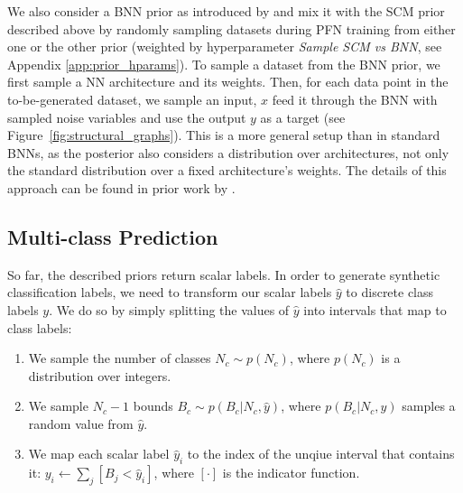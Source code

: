 \documentclass{article}
\begin{document}
We also consider a BNN prior as introduced by \citet{muller-iclr22a} and mix it with the SCM prior described above by randomly sampling datasets during PFN training from either one or the other prior (weighted by hyperparameter \textit{Sample SCM vs BNN}, see Appendix \ref{app:prior_hparams}).
To sample a dataset from the BNN prior, we first sample a 
NN architecture and its weights.
Then, for each data point in the to-be-generated dataset, we sample an input, $x$ %
feed it through the BNN with sampled noise variables and use the output $y$ as a target (see Figure~\ref{fig:structural_graphs}).%
This is a more general setup than in standard BNNs, as the posterior also considers a distribution over architectures, not only the standard distribution over a fixed architecture's weights.
The details of this approach can be found in prior work by \citet{muller-iclr22a}.

\subsection{Multi-class Prediction}
\label{sec:multi-class prediction}
So far, the described priors return scalar labels. In order to generate synthetic classification labels, we need to transform our scalar labels $\hat{y}$ to discrete class labels $y$. We do so by simply splitting the values of $\hat{y}$ into intervals that map to class labels:
\vspace{-4mm}\\
\begin{enumerate}[itemsep=-0.1em]
    \item We sample the number of classes $N_c \sim p(N_c)$, where $p(N_c)$ is a distribution over integers.
    \item  We sample $N_c-1$ bounds $B_c \sim p(B_c|N_c,\hat{y})$, where $p(B_c|N_c,\hat{y})$ samples a random value from $\hat{y}$. %
    \item We map each scalar label $\hat{y}_i$ to the index of the unqiue interval that contains it:
    $y_i \gets \sum_{j} [B_j < \hat{y}_i]$, where $[\cdot]$ is the indicator function.
\end{enumerate}
\end{document}
